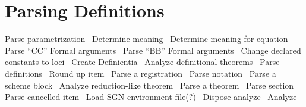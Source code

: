 \section{Parsing Definitions}

\nwenddocs{}\plusendmoddef\nwstartdeflinemarkup{}\nwenddeflinemarkup
\LA{}Parse parametrization~{\nwtagstyle{}}\RA{}
\LA{}Determine meaning~{\nwtagstyle{}}\RA{}
\LA{}Determine meaning for equation~{\nwtagstyle{}}\RA{}
\LA{}Parse ``CC'' Formal arguments~{\nwtagstyle{}}\RA{}
\LA{}Parse ``BB'' Formal arguments~{\nwtagstyle{}}\RA{}
\LA{}Change declared constants to loci~{\nwtagstyle{}}\RA{}
\LA{}Create Definientia~{\nwtagstyle{}}\RA{}
\LA{}Analyze definitional theorems~{\nwtagstyle{}}\RA{}
\LA{}Parse definitions~{\nwtagstyle{}}\RA{}
\LA{}Round up item~{\nwtagstyle{}}\RA{}
\LA{}Parse a registration~{\nwtagstyle{}}\RA{}
\LA{}Parse notation~{\nwtagstyle{}}\RA{}
\LA{}Parse a scheme block~{\nwtagstyle{}}\RA{}
\LA{}Analyze reduction-like theorem~{\nwtagstyle{}}\RA{}
\LA{}Parse a theorem~{\nwtagstyle{}}\RA{}
\LA{}Parse section~{\nwtagstyle{}}\RA{}
\LA{}Parse cancelled item~{\nwtagstyle{}}\RA{}
\LA{}Load SGN environment file(?)~{\nwtagstyle{}}\RA{}
\LA{}Dispose analyze~{\nwtagstyle{}}\RA{}
\LA{}Analyze~{\nwtagstyle{}}\RA{}
\nwendcode{}\nwdocspar

